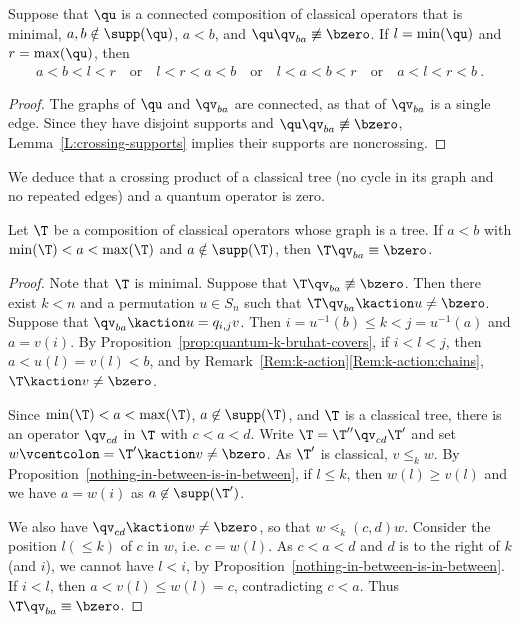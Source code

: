 \begin{corollary}
    \label{corollary-classical-product-times-quantum}
    Suppose that $\qu$ is a connected composition of classical operators that is minimal,
    $a, b \notin \supp(\qu)$, $a<b$, and $\qu \qv_{ba} \not\equiv \bzero$.
    If $l = \min(\qu)$ and $r = \max(\qu)$, then
    \begin{gather*}
        a < b < l < r
        \quad\text{or}\quad
        l < r < a < b
        \quad\text{or}\quad
        l < a < b < r
        \quad\text{or}\quad
        a < l < r < b\ .
    \end{gather*}
\end{corollary}

\begin{proof}
    The graphs of $\qu$ and $\qv_{ba}$ are connected, as that of $\qv_{ba}$ is a single edge.
    Since they have disjoint supports and $\qu \qv_{ba} \not\equiv \bzero$, Lemma~\ref{L:crossing-supports}
    implies their supports are noncrossing.
\end{proof}

We deduce that a crossing product of a classical tree (no cycle in its graph and no repeated edges) and
a quantum operator is zero.

\begin{corollary}
    \label{T*vq=0}
    Let $\T$ be a composition of classical operators whose graph is a tree.
    If $a<b$ with $\min(\T) < a < \max(\T)$
    and $a \notin \supp(\T)$, then $\T \qv_{ba} \equiv \bzero$.
\end{corollary}

\begin{proof}
  Note that $\T$ is minimal.
  Suppose that  $\T \qv_{ba} \not\equiv \bzero$.
  Then there exist $k<n$ and a permutation $u\in S_n$ such that $\T\qv_{ba}\kaction u\neq\bzero$.
  Suppose that $\qv_{ba}\kaction u = q_{i, j} v$.
  Then $i=u^{-1}(b)\leq k <j=u^{-1}(a)$ and $a=v(i)$.
  By Proposition~\ref{prop:quantum-k-bruhat-covers}, if $i<l<j$, then $a<u(l)=v(l)<b$, and 
  by  Remark~\ref{Rem:k-action}\ref{Rem:k-action:chains}, $\T\kaction v\neq\bzero$.

  Since  $\min(\T)<a<\max(\T)$, $a\not\in\supp(\T)$, and $\T$ is a classical tree, there is an operator $\qv_{cd}$ in $\T$ with $c<a<d$.
  Write $\T=\T'' \qv_{cd} \T'$ and set $w \vcentcolon= \T' \kaction v\neq \bzero$.
  As $\T'$ is classical, $v\leq_k w$.
  By Proposition~\ref{nothing-in-between-is-in-between},
  if $l\leq k$, then $w(l)\geq v(l)$ and we have $a=w(i)$ as $a\not\in\supp(\T')$.

  We also have $\qv_{cd}\kaction w\neq\bzero$, so that $w\lessdot_k (c,d)w$.
  Consider the position $l(\leq k)$ of $c$ in $w$, i.e. $c=w(l)$.
  As $c<a<d$ and $d$ is to the right of $k$ (and $i$), we cannot have $l<i$, by Proposition~\ref{nothing-in-between-is-in-between}.
  If $i<l$, then $a<v(l)\leq w(l)=c$, contradicting $c<a$.
  Thus~$\T \qv_{ba}\equiv \bzero$.
\end{proof}

